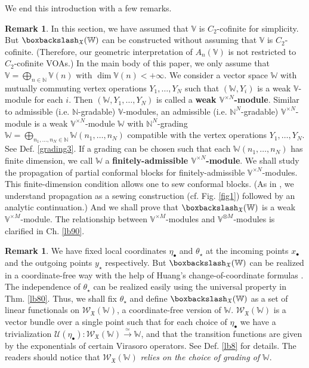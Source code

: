 \documentclass[11pt,b5paper,notitlepage]{article}
\theoremstyle{definition}
\newtheorem{rem}[df]{Remark}
\theoremstyle{plain}
\newcommand{\mc}{\mathcal}
\newcommand{\scr}{\mathscr}
\newcommand{\blt}{\bullet}
\newcommand{\Vbb}{\mathbb V}
\newcommand{\Wbb}{\mathbb W}
\newcommand{\Nbb}{\mathbb N}
\newcommand{\<}{\left\langle}
\renewcommand{\>}{\right\rangle}
\newcommand{\fx}{\mathfrak{X}}
\newcommand{\bbs}{\boxbackslash}
\numberwithin{equation}{subsection}
\begin{document}
We end this introduction with a few remarks.

\begin{rem}
In this section, we have assumed that $\Vbb$ is $C_2$-cofinite for simplicity. But $\bbs_\fx(\Wbb)$ can be constructed without assuming that $\Vbb$ is $C_2$-cofinite. (Therefore, our geometric interpretation of $A_n(\Vbb)$ is not restricted to $C_2$-cofinite VOAs.) In the main body of this paper, we only assume that $\Vbb=\bigoplus_{n\in\Nbb}\Vbb(n)$ with $\dim \Vbb(n)<+\infty$. We consider a vector space $\Wbb$ with mutually commuting vertex operations $Y_1,\dots,Y_N$ such that $(\Wbb,Y_i)$ is a weak $\Vbb$-module for each $i$. Then $(\Wbb, Y_1,\dots,Y_N)$ is called a \textbf{weak $\Vbb^{\times N}$-module}. Similar to admissible (i.e. $\Nbb$-gradable) $\Vbb$-modules, an admissible (i.e. $\Nbb^N$-gradable) $\Vbb^{\times N}$-module is a weak $\Vbb^{\times N}$-module $\Wbb$ with $\Nbb^N$-grading $\Wbb=\bigoplus_{n_1,\dots,n_N\in\Nbb}\Wbb(n_1,\dots,n_N)$ compatible with the vertex operations $Y_1,\dots,Y_N$. See Def. \ref{grading3}. If a grading can be chosen such that each $\Wbb(n_1,\dots,n_N)$ has finite dimension, we call $\Wbb$ a \textbf{finitely-admissible $\Vbb^{\times N}$-module}. We shall study the propagation of partial conformal blocks for finitely-admissible $\Vbb^{\times N}$-modules. This finite-dimension condition allows one to sew conformal blocks. (As in \cite{Gui-propagation}, we understand propagation as a sewing construction (cf. Fig. \ref{fig1}) followed by an analytic continuation.) And we shall prove that $\bbs_\fx(\Wbb)$ is a weak $\Vbb^{\times M}$-module. The relationship between $\Vbb^{\times M}$-modules and $\Vbb^{\otimes M}$-modules is clarified in Ch. \ref{lb90}. 
\end{rem}

\begin{rem}
We have fixed local coordinates $\eta_\blt$ and $\theta_\star$ at the incoming points $x_\blt$ and the outgoing points $y_\star$ respectively. But $\bbs_\fx(\Wbb)$ can be realized in a coordinate-free way with the help of Huang's change-of-coordinate formulas \cite{Hua97}. The independence of $\theta_\star$ can be realized easily using the universal property in Thm. \ref{lb80}. Thus, we shall fix $\theta_\star$ and define $\bbs_\fx(\Wbb)$ as a set of linear functionals on $\scr W_\fx(\Wbb)$, a coordinate-free version of $\Wbb$. $\scr W_\fx(\Wbb)$ is a vector bundle over a single point such that for each choice of $\eta_\blt$ we have a trivialization $\mc U(\eta_\blt):\scr W_\fx(\Wbb)\xrightarrow{\simeq}\Wbb$, and that the transition functions are given by the exponentials of certain Virasoro operators. See Def. \ref{lb8} for details. The readers should notice that $\scr W_\fx(\Wbb)$ \emph{relies on the choice of grading of $\Wbb$}.
\end{rem}
\end{document}
